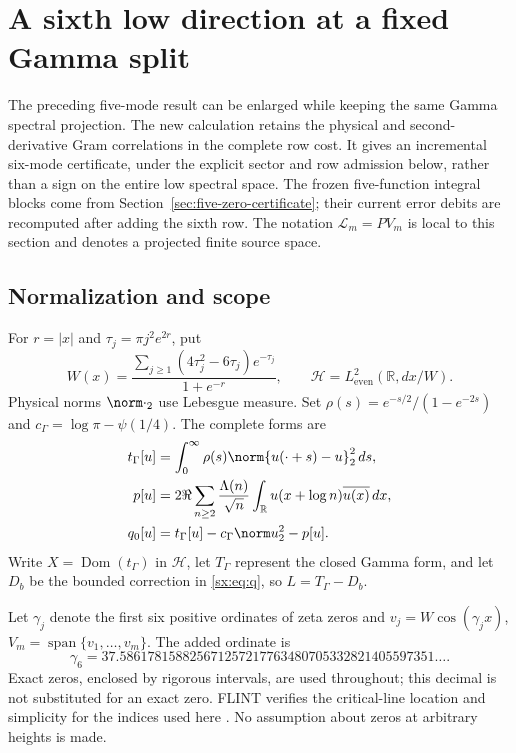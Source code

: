 \documentclass[11pt,a4paper]{article}
\numberwithin{equation}{section}
\theoremstyle{definition}\newtheorem{definition}[theorem]{Definition}
\theoremstyle{remark}\newtheorem{remark}[theorem]{Remark}
\newcommand{\Hh}{\mathcal H}\newcommand{\Hw}{\mathcal H}
\begin{document}
\section{A sixth low direction at a fixed Gamma split}
\label{sx:sec:six}
The preceding five-mode result can be enlarged while keeping the same
Gamma spectral projection. The new calculation retains the physical and
second-derivative Gram correlations in the complete row cost. It gives
an incremental six-mode certificate, under the explicit sector and row
admission below, rather than a sign on the entire low spectral space.
The frozen five-function integral blocks come from
Section~\ref{sec:five-zero-certificate}; their current error debits are
recomputed after adding the sixth row. The notation $\mathcal L_m=PV_m$
is local to this section and denotes a projected finite source space.

\subsection{Normalization and scope}
For $r=|x|$ and $\tau_j=\pi j^2e^{2r}$, put
\[
 W(x)=\frac{\sum_{j\ge1}(4\tau_j^2-6\tau_j)e^{-\tau_j}}{1+e^{-r}},
 \qquad\Hh=L^2_{\mathrm{even}}(\mathbb R,dx/W).
\]
Physical norms $\norm\cdot_2$ use Lebesgue measure. Set
$\rho(s)=e^{-s/2}/(1-e^{-2s})$ and $c_\Gamma=\log\pi-\psi(1/4)$.
The complete forms are
\begin{align}
 t_\Gamma[u]&=\int_0^\infty\rho(s)\norm{u(\cdot+s)-u}_2^2\,ds,\label{sx:eq:t}\\
 p[u]&=2\Re\sum_{n\ge2}\frac{\Lambda(n)}{\sqrt n}
          \int_{\mathbb R}u(x+\log n)\overline{u(x)}\,dx,\label{sx:eq:p}\\
 q_0[u]&=t_\Gamma[u]-c_\Gamma\norm u_2^2-p[u].\label{sx:eq:q}
\end{align}
Write $X=\operatorname{Dom}(t_\Gamma)$ in $\Hh$, let $T_\Gamma$
represent the closed Gamma form, and let $D_b$ be the bounded correction
in \eqref{sx:eq:q}, so $L=T_\Gamma-D_b$.

Let $\gamma_j$ denote the first six positive ordinates of zeta zeros and
$v_j=W\cos(\gamma_jx)$, $V_m=\operatorname{span}\{v_1,\ldots,v_m\}$.
The added ordinate is
\[
 \gamma_6=37.586178158825671257217763480705332821405597351\ldots.
\]
Exact zeros, enclosed by rigorous intervals, are used throughout; this
decimal is not substituted for an exact zero. FLINT verifies the
critical-line location and simplicity for the indices used here
\cite{fzFlintZeros}. No assumption about zeros at arbitrary heights is made.
\end{document}
